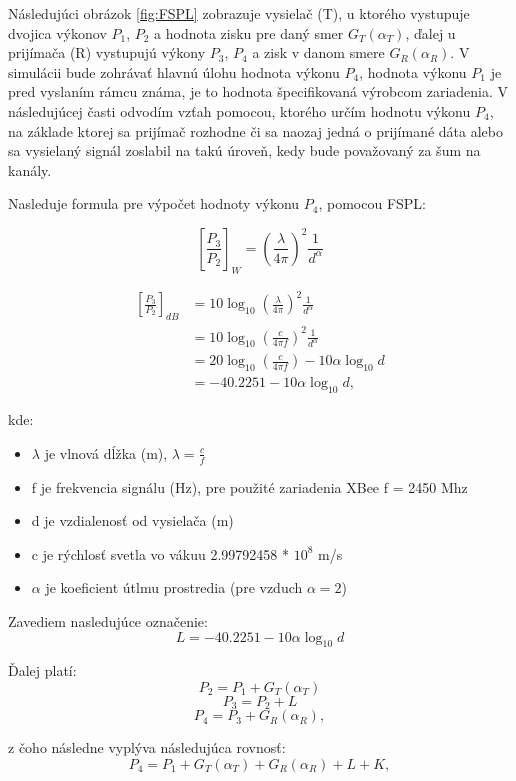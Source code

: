 \documentclass[11pt,twoside,a4paper]{book}
\begin{document}
Následujúci obrázok \ref{fig:FSPL} zobrazuje vysielač (T), u ktorého vystupuje dvojica výkonov $P_{1}$, $P_{2}$ a hodnota zisku pre daný smer $G_{T}(\alpha_{T})$, ďalej u prijímača (R) vystupujú výkony $P_{3}$, $P_{4}$ a zisk v danom smere $G_{R}(\alpha_{R})$. V simulácii bude zohrávať hlavnú úlohu hodnota výkonu $P_{4}$, hodnota výkonu $P_{1}$ je pred vyslaním rámcu známa, je to hodnota špecifikovaná výrobcom zariadenia. V následujúcej časti odvodím vzťah pomocou, ktorého určím hodnotu výkonu $P_{4}$, na základe ktorej sa prijímač rozhodne či sa naozaj jedná o prijímané dáta alebo sa vysielaný signál zoslabil na takú úroveň, kedy bude považovaný za šum na kanály.

Nasleduje formula pre výpočet hodnoty výkonu $P_{4}$, pomocou FSPL:

\[
\left[\frac{P_{3}}{P_{2}}\right]_{W} =\left(\frac{\lambda}{4\pi}\right)^{2}\frac{1}{d^{\alpha}}
\]

\begin{align*}
\left[\frac{P_{3}}{P_{2}}\right]_{dB} &= 10\log_{10}\left(\frac{\lambda}{4\pi}\right)^{2}\frac{1}{d^{\alpha}} \\
&= 10\log_{10}\left(\frac{c}{4\pi f}\right)^{2}\frac{1}{d^{\alpha}} \\
&= 20\log_{10}\left(\frac{c}{4\pi f}\right)-10\alpha\log_{10}d \\
&= -40.2251-10\alpha\log_{10}d, 
\end{align*}

kde:
\begin{itemize}
 \item $\lambda$ je vlnová dĺžka (m), $\lambda = \frac{c}{f}$
 \item f je frekvencia signálu (Hz), pre použité zariadenia XBee f = 2450 Mhz
 \item d je vzdialenosť od vysielača (m)
 \item c je rýchlosť svetla vo vákuu 2.99792458 * $10^{8}$ m/s
 \item $\alpha$ je koeficient útlmu prostredia (pre vzduch $\alpha = 2$)
\end{itemize}

Zavediem nasledujúce označenie:
$$L = -40.2251 - 10\alpha\log_{10}d$$

Ďalej platí:
\[
P_{2} = P_{1} + G_{T}(\alpha_{T}) \]
\[
P_{3} = P_{2} + L \]
\[
P_{4} = P_{3} + G_{R}(\alpha_{R}), \]

z čoho následne vyplýva následujúca rovnosť:
$$
P_{4} = P_{1} + G_{T}(\alpha_{T}) + G_{R}(\alpha_{R}) + L + K,
$$
\end{document}

